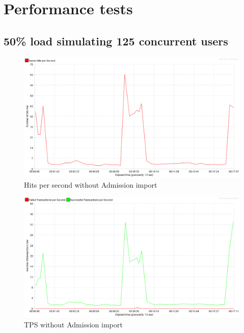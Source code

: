 \chapter{Performance tests}\label{app:performance}

	\section{50\% load simulating 125 concurrent users}	

	\begin{figure}[h]
		\label{fig:jmeter:hits_per_second_125_without_admission_import}
		\centering
		\includegraphics[width=12cm]{figures/jmeter/hits_per_second_125_without_admission_import}
		\caption{Hits per second without Admission import}
	\end{figure}
	
	\newpage

	\begin{figure}[h]
		\label{fig:jmeter:tps_125_without_admission_import}
		\centering
		\includegraphics[width=12cm]{figures/jmeter/tps_125_without_admission_import}
		\caption{TPS without Admission import}
	\end{figure}

